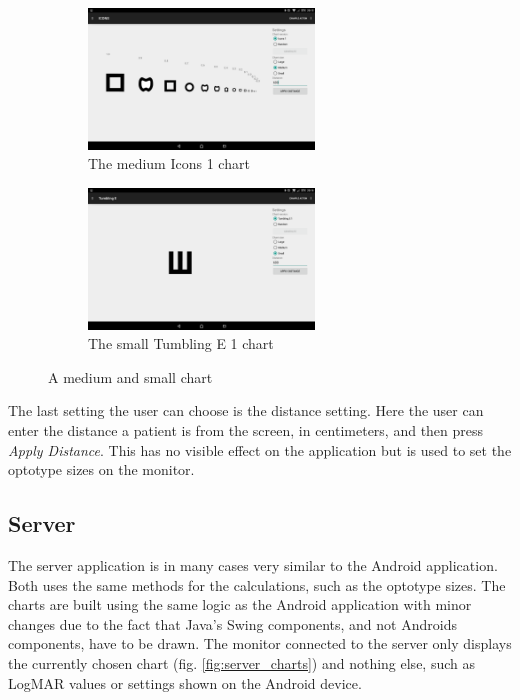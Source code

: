 \documentclass[12pt,a4paper,notitlepage]{report}
\begin{document}
\begin{figure}[ht!]
\centering
\begin{subfigure}{.5\textwidth}
  \centering
  \includegraphics[width=60mm]{images/appgui/icons_medium.png}
  \caption{The medium Icons 1 chart}
  \label{fig:icons_medium}
\end{subfigure}%
\begin{subfigure}{.5\textwidth}
  \centering
  \includegraphics[width=60mm]{images/appgui/tumbling_e_small.png}
  \caption{The small Tumbling E 1 chart}
  \label{fig:tumbling_e_small}
\end{subfigure}
\caption{A medium and small chart}
\label{fig:chart_medium_small}
\end{figure}

The last setting the user can choose is the distance setting. Here the user can enter the distance a patient is from the screen, in centimeters, and then press \textit{Apply Distance}. This has no visible effect on the application but is used to set the optotype sizes on the monitor.

\subsection{Server}
The server application is in many cases very similar to the Android application. Both uses the same methods for the calculations, such as the optotype sizes. The charts are built using the same logic as the Android application with minor changes due to the fact that Java's Swing components, and not Androids components, have to be drawn. The monitor connected to the server only displays the currently chosen chart (fig. \ref{fig:server_charts}) and nothing else, such as LogMAR values or settings shown on the Android device.
\end{document}
